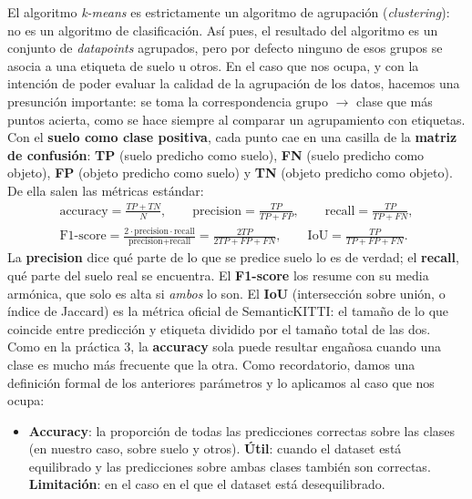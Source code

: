 \documentclass{article}
\begin{document}
\begin{tcolorbox}[colback=gray!5!white, colframe=gray!60!black, title=\textbf{Cómo se evalúa: matriz de confusión y métricas}]
El algoritmo \textit{k-means}  es estrictamente un algoritmo de agrupación (\textit{clustering}): no es un algoritmo de clasificación. Así pues, el resultado del algoritmo es un conjunto de \textit{datapoints} agrupados, pero por defecto ninguno de esos grupos se asocia a una etiqueta de suelo u otros. En el caso que nos ocupa, y con la intención de poder evaluar la calidad de la agrupación de los datos, hacemos una presunción importante: se toma la correspondencia grupo $\rightarrow$ clase que más puntos acierta, como se hace siempre al comparar un agrupamiento con etiquetas. Con el \textbf{suelo como clase positiva}, cada punto cae en una casilla de la \textbf{matriz de confusión}: \textbf{TP} (suelo predicho como suelo), \textbf{FN} (suelo predicho como objeto), \textbf{FP} (objeto predicho como suelo) y \textbf{TN} (objeto predicho como objeto). De ella salen las métricas estándar:
\begin{gather*}
\text{accuracy} = \frac{TP + TN}{N}, \qquad
\text{precision} = \frac{TP}{TP + FP}, \qquad
\text{recall} = \frac{TP}{TP + FN}, \\
\text{F1-score} = \frac{2 \cdot \text{precision} \cdot \text{recall}}{\text{precision} + \text{recall}} = \frac{2TP}{2TP+FP+FN}, \qquad
\text{IoU} = \frac{TP}{TP + FP + FN}.
\end{gather*}
La \textbf{precision} dice qué parte de lo que se predice suelo lo es de verdad; el \textbf{recall}, qué parte del suelo real se encuentra. El \textbf{F1-score} los resume con su media armónica, que solo es alta si \emph{ambos} lo son. El \textbf{IoU} (intersección sobre unión, o índice de Jaccard) es la métrica oficial de SemanticKITTI: el tamaño de lo que coincide entre predicción y etiqueta dividido por el tamaño total de las dos. Como en la práctica 3, la \textbf{accuracy} sola puede resultar engañosa cuando una clase es mucho más frecuente que la otra.
Como recordatorio, damos una definición formal de los anteriores parámetros y lo aplicamos al caso que nos ocupa:
\begin{itemize}
\item \textbf{Accuracy}: la proporción de todas las predicciones correctas sobre las clases (en nuestro caso, sobre suelo  y otros). \textbf{Útil}: cuando el dataset está equilibrado y las predicciones sobre ambas clases también son correctas. \textbf{Limitación}: en el caso en el que el dataset está desequilibrado.

\end{itemize}
\end{tcolorbox}
\end{document}
